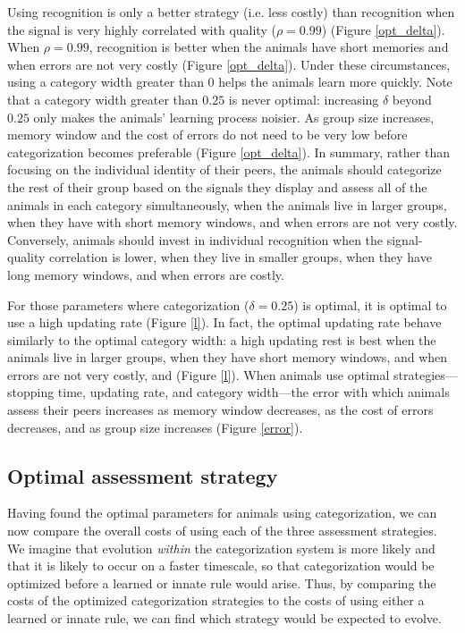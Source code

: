 Using recognition is only a better strategy (i.e. less costly) than recognition when the signal is very highly correlated with quality ($\rho=0.99$) (Figure \ref{opt_delta}). When $\rho=0.99$, recognition is better when the animals have short memories and when errors are not very costly (Figure \ref{opt_delta}). Under these circumstances, using a category width greater than $0$ helps the animals learn more quickly. Note that a category width greater than $0.25$ is never optimal: increasing $\delta$ beyond $0.25$ only makes the animals' learning process noisier. As group size increases, memory window and the cost of errors do not need to be very low before categorization becomes preferable (Figure \ref{opt_delta}). In summary, rather than focusing on the individual identity of their peers, the animals should categorize the rest of their group based on the signals they display and assess all of the animals in each category simultaneously, when the animals live in larger groups, when they have with short memory windows, and when errors are not very costly. Conversely, animals should invest in individual recognition when the signal-quality correlation is lower, when they live in smaller groups, when they have long memory windows, and when errors are costly. 

For those parameters where categorization ($\delta=0.25$) is optimal, it is optimal to use a high updating rate (Figure \ref{l}). In fact, the optimal updating rate behave similarly to the optimal category width: a high updating rest is best when the animals live in larger groups, when they have short memory windows, and when errors are not very costly, and  (Figure \ref{l}). When animals use optimal strategies---stopping time, updating rate, and category width---the error with which animals assess their peers increases as memory window decreases, as the cost of errors decreases, and as group size increases (Figure \ref{error}). 


\subsection*{Optimal assessment strategy}
Having found the optimal parameters for animals using categorization, we can now compare the overall costs of using each of the three assessment strategies. We imagine that evolution \emph{within} the categorization system is more likely and that it is likely to occur on a faster timescale, so that categorization would be optimized before a learned or innate rule would arise.  Thus, by comparing the costs of the optimized categorization strategies to the costs of using either a learned or innate rule, we can find which strategy would be expected to evolve.

